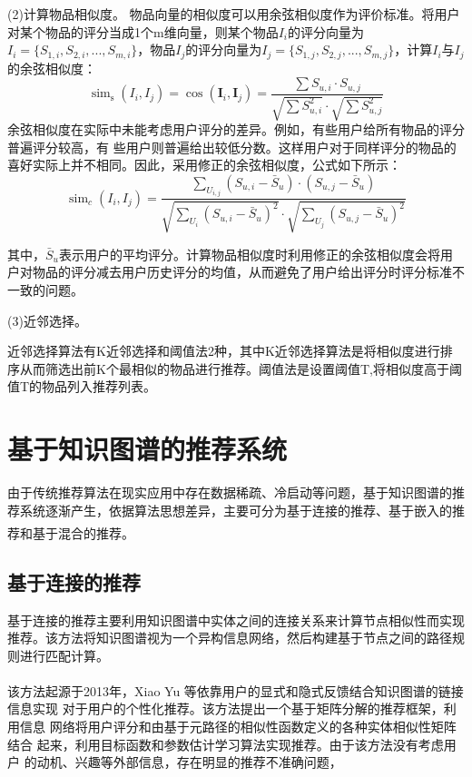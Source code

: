 \documentclass{article}
\newcommand{\upcite}[1]{\textsuperscript{\textsuperscript{\cite{#1}}}}
\begin{document}
	(2)计算物品相似度。
	物品向量的相似度可以用余弦相似度作为评价标准。将用户对某个物品的评分当成1个m维向量，则某个物品$I_i$的评分向量为$I_i=\{{S_{1,i},S_{2,i},...,S_{m,i}}\}$，物品$I_j$的评分向量为$I_j=\{{S_{1,j},S_{2,j},...,S_{m,j}}\}$，计算$I_i$与$I_j$的余弦相似度：
	\begin{equation}
	\operatorname{sim}_{\mathrm{s}}\left(I_{i}, I_{j}\right)=\cos \left(\boldsymbol{I}_{i}, \boldsymbol{I}_{j}\right)=\frac{\sum S_{u, i} \cdot S_{u, j}}{\sqrt{\sum S_{u, i}^{2}} \cdot \sqrt{\sum S_{u, j}^{2}}}
	\end{equation}
	余弦相似度在实际中未能考虑用户评分的差异。例如，有些用户给所有物品的评分普遍评分较高，有
	些用户则普遍给出较低分数。这样用户对于同样评分的物品的喜好实际上并不相同。因此，采用修正的余弦相似度，公式如下所示：
	\begin{equation}
	\operatorname{sim}_{c}\left(I_{i}, I_{j}\right)=\frac{\sum_{U_{i, j}}\left(S_{u, i}-\bar{S}_{u}\right) \cdot\left(S_{u, j}-\bar{S}_{u}\right)}{\sqrt{\sum_{U_{i}}\left(S_{u, i}-\bar{S}_{u}\right)^{2}} \cdot \sqrt{\sum_{U_{j}}\left(S_{u, j}-\bar{S}_{u}\right)^{2}}}
	\end{equation}
	
	其中，$\bar{S}_{u}$表示用户的平均评分。计算物品相似度时利用修正的余弦相似度会将用户对物品的评分减去用户历史评分的均值，从而避免了用户给出评分时评分标准不一致的问题。
	
	(3)近邻选择。
	
	近邻选择算法有K近邻选择和阈值法2种，其中K近邻选择算法是将相似度进行排序从而筛选出前K个最相似的物品进行推荐。阈值法是设置阈值T,将相似度高于阈值T的物品列入推荐列表。

	\section{基于知识图谱的推荐系统}
    由于传统推荐算法在现实应用中存在数据稀疏、冷启动等问题，基于知识图谱的推荐系统逐渐产生，依据算法思想差异，主要可分为基于连接的推荐、基于嵌入的推荐和基于混合的推荐\upcite{1}。
    
    \subsection{基于连接的推荐}
    基于连接的推荐主要利用知识图谱中实体之间的连接关系来计算节点相似性而实现推荐。该方法将知识图谱视为一个异构信息网络，然后构建基于节点之间的路径规则进行匹配计算。
    
    该方法起源于2013年，Xiao Yu 等\upcite{3}依靠用户的显式和隐式反馈结合知识图谱的链接信息实现
    对于用户的个性化推荐。该方法提出一个基于矩阵分解的推荐框架，利用信息
    网络将用户评分和由基于元路径的相似性函数定义的各种实体相似性矩阵结合
    起来，利用目标函数和参数估计学习算法实现推荐。由于该方法没有考虑用户
    的动机、兴趣等外部信息，存在明显的推荐不准确问题，
	
\end{document}
